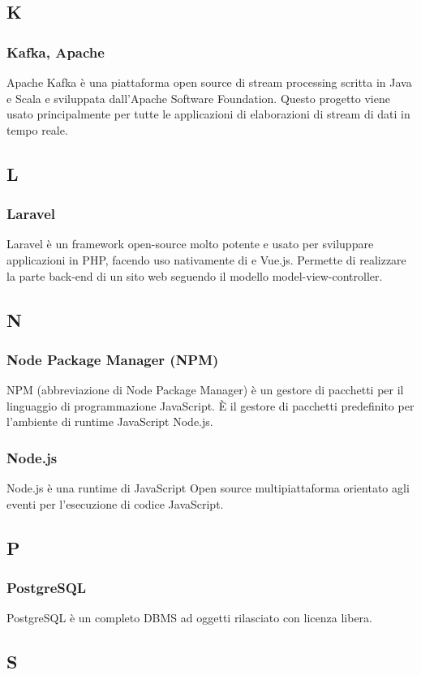 \subsection{K}
\subsubsection*{Kafka, Apache}  Apache Kafka è una piattaforma open source di stream processing scritta in Java e Scala e sviluppata dall'Apache Software Foundation.  Questo progetto viene usato principalmente per tutte le applicazioni di elaborazioni di stream di dati in tempo reale.
\subsection{L}
\subsubsection*{Laravel}  Laravel è un framework open-source molto potente e usato per sviluppare applicazioni in PHP, facendo uso nativamente di  e Vue.js. Permette di realizzare la parte back-end di un sito web seguendo il modello model-view-controller. 
\subsection{N}
\subsubsection*{Node Package Manager (NPM)}  NPM (abbreviazione di Node Package Manager) è un gestore di pacchetti per il linguaggio di programmazione JavaScript. È il gestore di pacchetti predefinito per l'ambiente di runtime JavaScript Node.js.
\subsubsection*{Node.js}  Node.js è una runtime di JavaScript Open source multipiattaforma orientato agli eventi per l'esecuzione di codice JavaScript.
\subsection{P}
\subsubsection*{PostgreSQL}  PostgreSQL è un completo DBMS ad oggetti rilasciato con licenza libera.
\subsection{S}
